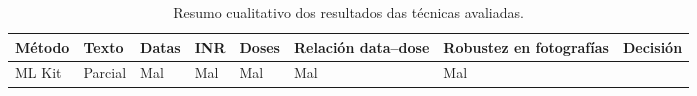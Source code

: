 \begin{table}[htbp]
    \centering
    \scriptsize
    \setlength{\tabcolsep}{2pt}
    \renewcommand{\arraystretch}{1.25}
    \caption{Resumo cualitativo dos resultados das técnicas avaliadas.}
    \label{tab:comparacion-metodos-extraccion}

    \begin{tabularx}{\textwidth}{
        >{\raggedright\arraybackslash}p{2.05cm}
        >{\centering\arraybackslash}X
        >{\centering\arraybackslash}X
        >{\centering\arraybackslash}X
        >{\centering\arraybackslash}X
        >{\centering\arraybackslash}X
        >{\centering\arraybackslash}X
        >{\centering\arraybackslash}p{1.35cm}}
        \toprule

        \textbf{Método} &
        \textbf{Texto} &
        \textbf{Datas} &
        \textbf{INR} &
        \textbf{Doses} &
        \textbf{Relación data--dose} &
        \textbf{Robustez en fotografías} &
        \textbf{Decisión} \\
        \midrule


        ML Kit

            & Parcial

            & Mal

            & Mal

            & Mal

            & Mal

            & Mal


\end{tabularx}
\end{table}

